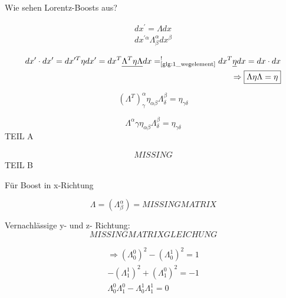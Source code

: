 \documentclass[a4paper, 11pt]{article}
\numberwithin{equation}{section}
\begin{document}
Wie sehen Lorentz-Boosts aus?

\begin{equation}
\begin{aligned}
dx^\prime = \Lambda dx \\
dx^{\prime \alpha}\Lambda^\alpha_\beta dx^\beta
\end{aligned}
\end{equation}

\begin{equation}
\begin{aligned}
dx^\prime \cdot dx^\prime = dx^{\prime T} \eta dx^\prime = dx^T \underline{\Lambda^T \eta  \Lambda} dx =^!_\text{\ref{glg:1_wegelement}} dx^T \underline{\eta} dx = dx \cdot dx \\
\Rightarrow \boxed{\Lambda \eta \Lambda = \eta}
\end{aligned}
\end{equation}

\begin{equation*}
\left( \Lambda^T \right)_\gamma^\alpha \eta_{\alpha \beta} \Lambda^\beta_\delta = \eta_{\gamma\delta}
\end{equation*}

\begin{equation}
\boxed{
\Lambda^\alpha \gamma \eta_{\alpha \beta} \Lambda^\beta_\delta = \eta_{\gamma\delta}
}
\end{equation}
TEIL A

\begin{equation*}
\begin{aligned}
MISSING
\end{aligned}
\end{equation*}
TEIL B


Für Boost in x-Richtung

\begin{equation}
\Lambda = \left(\Lambda^\alpha_\beta \right) = MISSING MATRIX
\end{equation}

Vernachlässige y- und z- Richtung:
\begin{equation*}
MISSING MATRIX GLEICHUNG
\end{equation*}

\begin{equation*}
\begin{aligned}
\Rightarrow \left(\Lambda^0_0 \right)^2 - \left(\Lambda^1_0 \right)^2 = 1\\
- \left(\Lambda^1_1 \right)^2 + \left(\Lambda^0_1 \right)^2  = -1 \\
\Lambda^0_0 \Lambda^0_1 - \Lambda^1_0 \Lambda^1_1 = 0
\end{aligned}
\end{equation*}
\end{document}
